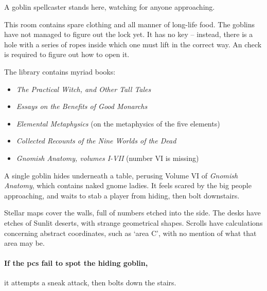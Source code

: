 \begin{multicols}{2}

A goblin spellcaster stands here, watching for anyone approaching.

\goblincaster

\showStdSpells


This room contains spare clothing and all manner of long-life food.
The goblins have not managed to figure out the lock yet.
It has no key -- instead, there is a hole with a series of ropes inside which one must lift in the correct way.
An  check \tn[10] is required to figure out how to open it.


The library contains myriad books:

\begin{itemize}
  \item
  \textit{The Practical Witch, and Other Tall Tales}
  \item
  \textit{Essays on the Benefits of Good Monarchs}
  \item
  \textit{Elemental Metaphysics}
  (on the metaphysics of the five elements)
  \item
  \textit{Collected Recounts of the Nine Worlds of the Dead}
  \item
  \textit{Gnomish Anatomy, volumes I-VII}
  (number VI is missing)
\end{itemize}

\noindent
A single goblin hides underneath a table, perusing Volume VI of \textit{Gnomish Anatomy}, which contains naked gnome ladies.
It feels scared by the big people approaching, and waits to stab a player from hiding, then bolt downstairs.

\begin{boxtext}

  Stellar maps cover the walls, full of numbers etched into the side.
  The desks have etches of Sunlit deserts, with strange geometrical shapes.
  Scrolls have calculations concerning abstract coordinates, such as `area C', with no mention of what that area may be.

\end{boxtext}



\paragraph{If the \glspl{pc} fail to spot the hiding goblin,}
it attempts a sneak attack, then bolts down the stairs.


\end{multicols}
